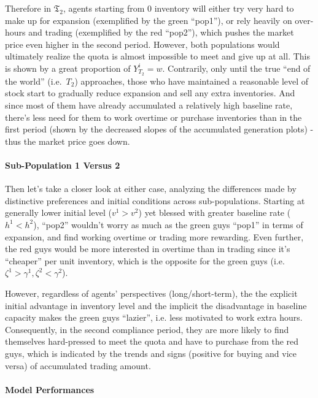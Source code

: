 \documentclass[a4paper,10pt]{article}
\newcommand{\1}{\mathbf{1}}
\begin{document}
Therefore in \(\mathfrak{T}_2\), agents starting from 0
inventory will either try very hard to make up for expansion
(exemplified by the green ``pop1''), or rely heavily on over-hours and
trading (exemplified by the red ``pop2''), which pushes the market price
even higher in the second period. However, both populations would
ultimately realize the quota is almost impossible to meet and give up at
all. This is shown by a great proportion of \(Y_{T_2}^i=w\). Contrarily,
only until the true ``end of the world'' (i.e.~\(T_2\)) approaches,
those who have maintained a reasonable level of stock start to
gradually reduce expansion and sell any extra inventories. And since
most of them have already accumulated a relatively high baseline rate,
there's less need for them to work overtime or purchase inventories than
in the first period (shown by the decreased slopes of the accumulated
generation plots) - thus the market price goes down.

\paragraph{Sub-Population 1 Versus 2}

Then let's take a closer look at either case, analyzing the differences
made by distinctive preferences and initial conditions across
sub-populations. Starting at generally lower initial level (\(v^1>v^2\))
yet blessed with greater baseline rate (\(h^1<h^2\)), ``pop2'' wouldn't
worry as much as the green guys ``pop1'' in terms of expansion, and find
working overtime or trading more rewarding. Even further, the red guys
would be more interested in overtime than in trading since it's
``cheaper'' per unit inventory, which is the opposite for the green guys
(i.e.~\(\zeta^1>\gamma^1, \zeta^2<\gamma^2\)).

However, regardless of agents' perspectives (long/short-term), the
the explicit initial advantage in inventory level and the implicit
the disadvantage in baseline capacity makes the green guys ``lazier'',
i.e. less motivated to work extra hours. Consequently, in the second
compliance period, they are more likely to find themselves hard-pressed
to meet the quota and have to purchase from the red guys, which is
indicated by the trends and signs (positive for buying and vice versa)
of accumulated trading amount.

\paragraph{Model Performances}
\end{document}

